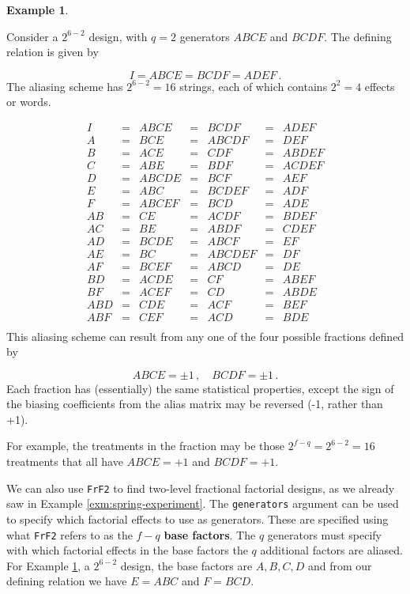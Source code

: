 \documentclass[
]{book}
\theoremstyle{definition}
\theoremstyle{definition}
\newtheorem{example}{Example}[chapter]
\theoremstyle{definition}
\theoremstyle{definition}
\theoremstyle{remark}
\begin{document}
\begin{example}
\protect\hypertarget{exm:frac-illustrative}{}\label{exm:frac-illustrative}

Consider a \(2^{6-2}\) design, with \(q=2\) generators \(ABCE\) and \(BCDF\). The defining relation is given by

\[
I = ABCE = BCDF = ADEF\,.
\]
The aliasing scheme has \(2^{6-2} = 16\) strings, each of which contains \(2^2 = 4\) effects or words.

\[
\begin{array}{ccccccc}
I & = & ABCE & = & BCDF & = & ADEF \\
A & = & BCE & = & ABCDF & = & DEF \\
B & = & ACE & = & CDF & = & ABDEF \\
C & = & ABE & = & BDF & = & ACDEF \\
D & = & ABCDE & = & BCF & = & AEF \\
E & = & ABC & = & BCDEF & = & ADF \\
F & = & ABCEF & = & BCD & = & ADE \\
AB & = & CE & = & ACDF & = & BDEF \\
AC & = & BE & = & ABDF & = & CDEF \\
AD & = & BCDE & = & ABCF & = & EF \\
AE & = & BC & = & ABCDEF & = & DF \\
AF & = & BCEF & = & ABCD & = & DE \\
BD & = & ACDE & = & CF & = & ABEF \\
BF & = & ACEF & = & CD & = & ABDE \\
ABD & = & CDE & = & ACF & = & BEF \\
ABF & = & CEF & = & ACD & = & BDE \\
\end{array}
\]
This aliasing scheme can result from any one of the four possible fractions defined by

\[
ABCE = \pm 1\,,\quad BCDF = \pm 1\,.
\]
Each fraction has (essentially) the same statistical properties, except the sign of the biasing coefficients from the alias matrix may be reversed (-1, rather than +1).

For example, the treatments in the fraction may be those \(2^{f-q} = 2^{6-2} = 16\) treatments that all have \(ABCE = +1\) and \(BCDF = +1\).

\end{example}

We can also use \texttt{FrF2} to find two-level fractional factorial designs, as we already saw in Example \ref{exm:spring-experiment}. The \texttt{generators} argument can be used to specify which factorial effects to use as generators. These are specified using what \texttt{FrF2} refers to as the \(f-q\) \textbf{base factors}. The \(q\) generators must specify with which factorial effects in the base factors the \(q\) additional factors are aliased.\\
For Example \ref{exm:frac-illustrative}, a \(2^{6-2}\) design, the base factors are \(A, B, C, D\) and from our defining relation we have \(E = ABC\) and \(F = BCD\).
\end{document}
